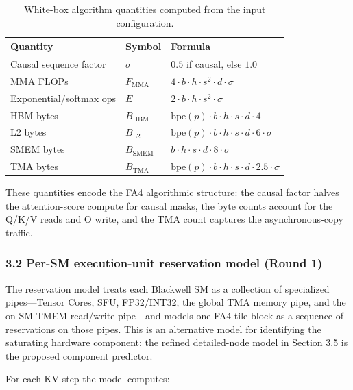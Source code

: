 \documentclass[
  10pt,journal,compsoc,twoside]{IEEEtran}
\begin{document}
\begin{table}[t]
\centering
\caption{White-box algorithm quantities computed from the input configuration.}
\label{tab:algorithm-quantities}
\small
\begin{tabularx}{\columnwidth}{@{}l l X@{}}
\hline
Quantity & Symbol & Formula \\
\hline
Causal sequence factor & $\sigma$ & $0.5$ if causal, else $1.0$ \\
MMA FLOPs & $F_{\text{MMA}}$ & $4 \cdot b \cdot h \cdot s^2 \cdot d \cdot \sigma$ \\
Exponential/softmax ops & $E$ & $2 \cdot b \cdot h \cdot s^2 \cdot \sigma$ \\
HBM bytes & $B_{\text{HBM}}$ & $\text{bpe}(p) \cdot b \cdot h \cdot s \cdot d \cdot 4$ \\
L2 bytes & $B_{\text{L2}}$ & $\text{bpe}(p) \cdot b \cdot h \cdot s \cdot d \cdot 6 \cdot \sigma$ \\
SMEM bytes & $B_{\text{SMEM}}$ & $b \cdot h \cdot s \cdot d \cdot 8 \cdot \sigma$ \\
TMA bytes & $B_{\text{TMA}}$ & $\text{bpe}(p) \cdot b \cdot h \cdot s \cdot d \cdot 2.5 \cdot \sigma$ \\
\hline
\end{tabularx}
\end{table}

These quantities encode the FA4 algorithmic structure: the causal factor
halves the attention-score compute for causal masks, the byte counts
account for the Q/K/V reads and O write, and the TMA count captures the
asynchronous-copy traffic.

\subsubsection{3.2 Per-SM execution-unit reservation model (Round
1)}\label{per-sm-execution-unit-reservation-model-round-1}

The reservation model treats each Blackwell SM as a collection of
specialized pipes---Tensor Cores, SFU, FP32/INT32, the global TMA memory
pipe, and the on-SM TMEM read/write pipe---and models one FA4 tile block
as a sequence of reservations on those pipes. This is an alternative
model for identifying the saturating hardware component; the refined
detailed-node model in Section 3.5 is the proposed component predictor.

For each KV step the model computes:
\end{document}
